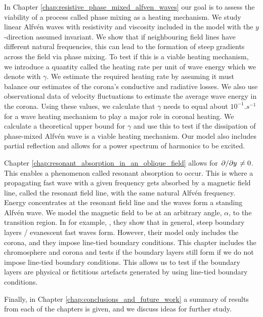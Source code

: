 In Chapter \ref{chap:resistive_phase_mixed_alfven_waves} our goal is to assess the viability of a process called phase mixing as a heating mechanism. We study linear Alfv\'en waves with resistivity and viscosity included in the model with the $y$-direction assumed invariant. We show that if neighbouring field lines have different natural frequencies, this can lead to the formation of steep gradients across the field via phase mixing. To test if this is a viable heating mechanism, we introduce a quantity called the heating rate per unit of wave energy which we denote with $\gamma$. We estimate the required heating rate by assuming it must balance our estimates of the corona's conductive and radiative losses. We also use observational data of velocity fluctuations to estimate the average wave energy in the corona. Using these values, we calculate that $\gamma$ needs to equal about $10^{-1}\si{.s^{-1}}$ for a wave heating mechanism to play a major role in coronal heating. We calculate a theoretical upper bound for $\gamma$ and use this to test if the dissipation of phase-mixed Alfv\'en wave is a viable heating mechanism. Our model also includes partial reflection and allows for a power spectrum of harmonics to be excited.

Chapter \ref{chap:resonant_absorption_in_an_oblique_field} allows for $\pdv*{}{y}\ne0$. This enables a phenomenon called resonant absorption to occur. This is where a propagating fast wave with a given frequency gets absorbed by a magnetic field line, called the resonant field line, with the same natural Alfv\'en frequency. Energy concentrates at the resonant field line and the waves form a standing Alfv\'en wave. We model the magnetic field to be at an arbitrary angle, $\alpha$, to the transition region. In for example, \citet{Halberstadt1993,Halberstadt1995,Arregui2003}, they show that in general, steep boundary layers / evanescent fast waves form. However, their model only includes the corona, and they impose line-tied boundary conditions. This chapter includes the chromosphere and corona and tests if the boundary layers still form if we do not impose line-tied boundary conditions. This allows us to test if the boundary layers are physical or fictitious artefacts generated by using line-tied boundary conditions.

Finally, in Chapter \ref{chap:conclusions_and_future_work} a summary of results from each of the chapters is given, and we discuss ideas for further study.